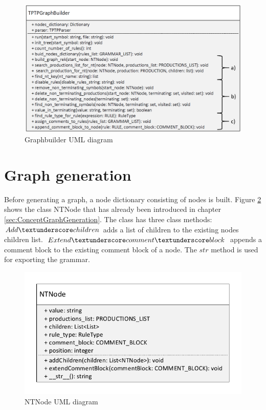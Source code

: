\begin{figure}[H]
\centering
\includegraphics[width=1 \textwidth]{images/uml_graphbuilderNEW.png}
\caption{Graphbuilder UML diagram}
\label{fig:ImplementationGraphbuilderUML}
\end{figure}                
                
\section{Graph generation}\label{sec:ImplementationGraphGeneration}

Before generating a graph, a node dictionary consisting of nodes is built. Figure \ref{fig:ImplementationNTNodeUML} shows the class NTNode that has already been introduced in chapter \ref{sec:ConceptGraphGeneration}. The class has three class methods:
$Add\textunderscore children$ adds a list of children to the existing nodes children list. $Extend\textunderscore comment\textunderscore block$ appends a comment block to the existing comment block of a node. The $str$ method is used for exporting the grammar.

\begin{figure}[H]
\centering
\includegraphics[width=1\textwidth]{images/uml_data_types_NTNode.pdf}
\caption{NTNode UML diagram}
\label{fig:ImplementationNTNodeUML}
\end{figure}

